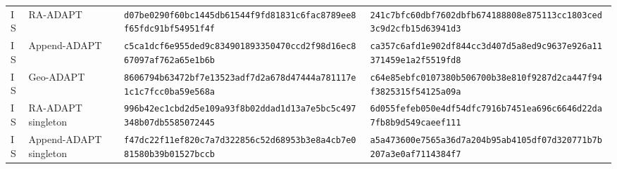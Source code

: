\documentclass[10pt,letterpaper]{article}
\begin{document}
\begin{longtable}{@{}llp{2.55in}p{2.55in}@{}}
IS & RA-ADAPT & \texttt{d07be029}\allowbreak{}\texttt{0f60bc14}\allowbreak{}\texttt{45db6154}\allowbreak{}\texttt{4f9fd818}\allowbreak{}\texttt{31c6fac8}\allowbreak{}\texttt{789ee8f6}\allowbreak{}\texttt{5fdc91bf}\allowbreak{}\texttt{54951f4f}\allowbreak{} & \texttt{241c7bfc}\allowbreak{}\texttt{60dbf760}\allowbreak{}\texttt{2dbfb674}\allowbreak{}\texttt{188808e8}\allowbreak{}\texttt{75113cc1}\allowbreak{}\texttt{803ced3c}\allowbreak{}\texttt{9d2cfb15}\allowbreak{}\texttt{d63941d3}\allowbreak{} \\
IS & Append-ADAPT & \texttt{c5ca1dcf}\allowbreak{}\texttt{6e955ded}\allowbreak{}\texttt{9c834901}\allowbreak{}\texttt{89335047}\allowbreak{}\texttt{0ccd2f98}\allowbreak{}\texttt{d16ec867}\allowbreak{}\texttt{097af762}\allowbreak{}\texttt{a65e1b6b}\allowbreak{} & \texttt{ca357c6a}\allowbreak{}\texttt{fd1e902d}\allowbreak{}\texttt{f844cc3d}\allowbreak{}\texttt{407d5a8e}\allowbreak{}\texttt{d9c9637e}\allowbreak{}\texttt{926a1137}\allowbreak{}\texttt{1459e1a2}\allowbreak{}\texttt{f5519fd8}\allowbreak{} \\
IS & Geo-ADAPT & \texttt{8606794b}\allowbreak{}\texttt{63472bf7}\allowbreak{}\texttt{e13523ad}\allowbreak{}\texttt{f7d2a678}\allowbreak{}\texttt{d47444a7}\allowbreak{}\texttt{81117e1c}\allowbreak{}\texttt{1c7fcc0b}\allowbreak{}\texttt{a59e568a}\allowbreak{} & \texttt{c64e85eb}\allowbreak{}\texttt{fc010738}\allowbreak{}\texttt{0b506700}\allowbreak{}\texttt{b38e810f}\allowbreak{}\texttt{9287d2ca}\allowbreak{}\texttt{447f94f3}\allowbreak{}\texttt{825315f5}\allowbreak{}\texttt{4125a09a}\allowbreak{} \\
IS & RA-ADAPT singleton & \texttt{996b42ec}\allowbreak{}\texttt{1cbd2d5e}\allowbreak{}\texttt{109a93f8}\allowbreak{}\texttt{b02ddad1}\allowbreak{}\texttt{d13a7e5b}\allowbreak{}\texttt{c5c49734}\allowbreak{}\texttt{8b07db55}\allowbreak{}\texttt{85072445}\allowbreak{} & \texttt{6d055fef}\allowbreak{}\texttt{eb050e4d}\allowbreak{}\texttt{f54dfc79}\allowbreak{}\texttt{16b7451e}\allowbreak{}\texttt{a696c664}\allowbreak{}\texttt{6d22da7f}\allowbreak{}\texttt{b8b9d549}\allowbreak{}\texttt{caeef111}\allowbreak{} \\
IS & Append-ADAPT singleton & \texttt{f47dc22f}\allowbreak{}\texttt{11ef820c}\allowbreak{}\texttt{7a7d3228}\allowbreak{}\texttt{56c52d68}\allowbreak{}\texttt{953b3e8a}\allowbreak{}\texttt{4cb7e081}\allowbreak{}\texttt{580b39b0}\allowbreak{}\texttt{1527bccb}\allowbreak{} & \texttt{a5a47360}\allowbreak{}\texttt{0e7565a3}\allowbreak{}\texttt{6d7a204b}\allowbreak{}\texttt{95ab4105}\allowbreak{}\texttt{df07d320}\allowbreak{}\texttt{771b7b20}\allowbreak{}\texttt{7a3e0af7}\allowbreak{}\texttt{114384f7}\allowbreak{} \\

\end{longtable}
\end{document}

